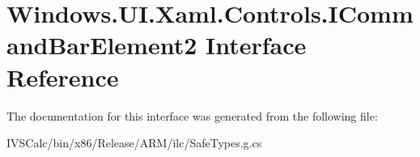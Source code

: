 \hypertarget{interface_windows_1_1_u_i_1_1_xaml_1_1_controls_1_1_i_command_bar_element2}{}\section{Windows.\+U\+I.\+Xaml.\+Controls.\+I\+Command\+Bar\+Element2 Interface Reference}
\label{interface_windows_1_1_u_i_1_1_xaml_1_1_controls_1_1_i_command_bar_element2}


The documentation for this interface was generated from the following file\+:\begin{DoxyCompactItemize}
\item 
I\+V\+S\+Calc/bin/x86/\+Release/\+A\+R\+M/ilc/Safe\+Types.\+g.\+cs\end{DoxyCompactItemize}
